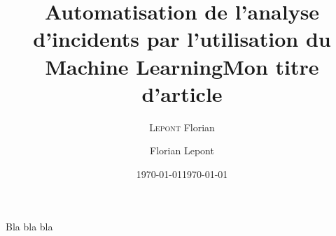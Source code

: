 \documentclass[a4paper,10pt]{report}
\title{Automatisation de l'analyse d'incidents par l'utilisation du Machine Learning}
\author{\textsc{Lepont} Florian}
\date{\today}
\title{Mon titre d'article}
\date{\today}
\author{Florian Lepont}
\begin{document}
	
\maketitle




\tableofcontents


Bla bla bla

\listoffigures
\listoftables
\printindex
\end{document}
